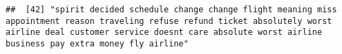 \documentclass[
]{article}
\begin{document}
\begin{verbatim}
##  [42] "spirit decided schedule change change flight meaning miss appointment reason traveling refuse refund ticket absolutely worst airline deal customer service doesnt care absolute worst airline business pay extra money fly airline"                                                                                                                                                                                                                                                                                                                                                                                                                                                                                                                                                                                                                                                                                                                                                                                                                                                                                                                                                                                                                                                                                                                                                                                                                                                                                                                                                                                                                                                                                                                                                            

\end{verbatim}
\end{document}
